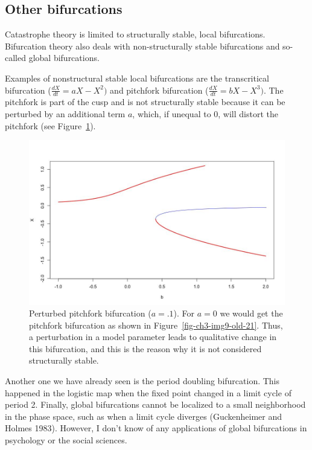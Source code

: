 \documentclass[
  a4paper,
  DIV=11,
  numbers=noendperiod,
  oneside]{scrreprt}
\begin{document}
\hypertarget{sec-Other-bifurcations}{%
\subsection{Other bifurcations}\label{sec-Other-bifurcations}}

Catastrophe theory is limited to structurally stable, local
bifurcations. Bifurcation theory also deals with non-structurally stable
bifurcations and so-called global bifurcations.

Examples of nonstructural stable local bifurcations are the
transcritical bifurcation (\(\frac{dX}{dt} = aX - X^{2})\) and pitchfork
bifurcation (\(\frac{dX}{dt} = bX - X^{3})\). The pitchfork is part of
the cusp and is not structurally stable because it can be perturbed by
an additional term \(a\), which, if unequal to 0, will distort the
pitchfork (see Figure~\ref{fig-ch3-img15-old-27}).

\begin{figure}

{\centering \includegraphics{media/ch3/image15.jpg}

}

\caption{\label{fig-ch3-img15-old-27}Perturbed pitchfork bifurcation
(\(a = .1\)). For \(a = 0\) we would get the pitchfork bifurcation as
shown in Figure~\ref{fig-ch3-img9-old-21}. Thus, a perturbation in a
model parameter leads to qualitative change in this bifurcation, and
this is the reason why it is not considered structurally stable.}

\end{figure}

Another one we have already seen is the period doubling bifurcation.
This happened in the logistic map when the fixed point changed in a
limit cycle of period 2. Finally, global bifurcations cannot be
localized to a small neighborhood in the phase space, such as when a
limit cycle diverges (Guckenheimer and Holmes 1983). However, I don't
know of any applications of global bifurcations in psychology or the
social sciences.
\end{document}
